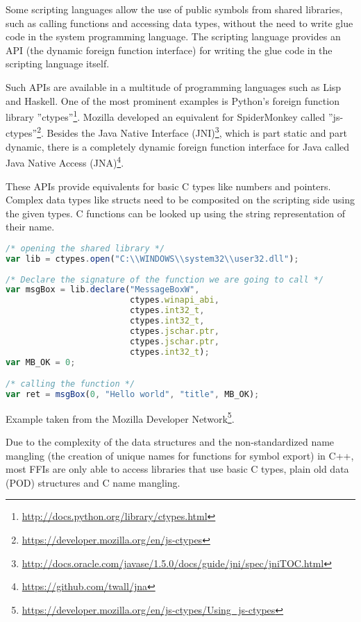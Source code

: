 Some scripting languages allow the use of public symbols from shared libraries, such as calling functions and accessing data types, without the need to write glue code in the system programming language. The scripting language provides an API (the dynamic foreign function interface) for writing the glue code in the scripting language itself.

Such APIs are available in a multitude of programming languages such as Lisp and Haskell. One of the most prominent examples is Python's foreign function library ''ctypes''\footnote{\url{http://docs.python.org/library/ctypes.html}}. Mozilla developed an equivalent for SpiderMonkey called ''js-ctypes''\footnote{\url{https://developer.mozilla.org/en/js-ctypes}}. Besides the Java Native Interface (JNI)\footnote{\url{http://docs.oracle.com/javase/1.5.0/docs/guide/jni/spec/jniTOC.html}}, which is part static and part dynamic, there is a completely dynamic foreign function interface for Java called Java Native Access (JNA)\footnote{\url{https://github.com/twall/jna}}.

These APIs provide equivalents for basic C types like numbers and pointers. Complex data types like structs need to be composited on the scripting side using the given types. C functions can be looked up using the string representation of their name.

\begin{lstlisting}[language=JavaScript, caption={Exposing a C function to JavaScript using js-ctypes}]
/* opening the shared library */
var lib = ctypes.open("C:\\WINDOWS\\system32\\user32.dll");  
  
/* Declare the signature of the function we are going to call */  
var msgBox = lib.declare("MessageBoxW",  
                         ctypes.winapi_abi,  
                         ctypes.int32_t,  
                         ctypes.int32_t,  
                         ctypes.jschar.ptr,  
                         ctypes.jschar.ptr,  
                         ctypes.int32_t);  
var MB_OK = 0;  

/* calling the function */
var ret = msgBox(0, "Hello world", "title", MB_OK); 
\end{lstlisting}

Example taken from the Mozilla Developer Network\footnote{\url{https://developer.mozilla.org/en/js-ctypes/Using_js-ctypes}}.

Due to the complexity of the data structures and the non-standardized name mangling (the creation of unique names for functions for symbol export) in C++, most FFIs are only able to access libraries that use basic C types, plain old data (POD) structures and C name mangling.

